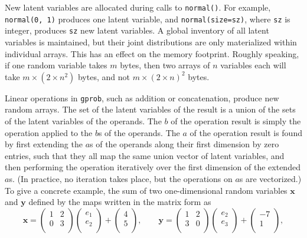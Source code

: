 \documentclass[a4paper,notitlepage]{article}
\renewcommand{\b}[1]{\mathbf{#1}}
\begin{document}
New latent variables are allocated during calls to \texttt{normal()}. For example, \texttt{normal(0, 1)} produces one latent variable, and \texttt{normal(size=sz)}, where \texttt{sz} is integer, produces \texttt{sz} new latent variables. A global inventory of all latent variables is maintained, but their joint distributions are only materialized within individual arrays. This has an effect on the memory footprint. Roughly speaking, if one random variable takes $m$ bytes, then two arrays of $n$ variables each will take $m\times(2\times n^2)$ bytes, and not $m\times (2\times n)^2$ bytes.


Linear operations in \texttt{gprob}, such as addition or concatenation, produce new random arrays.
The set of the latent variables of the result is a union of the sets of the latent variables of the operands. The $b$ of the operation result is simply the operation applied to the $b$s of the operands. The $a$ of the operation result is found by first extending the $a$s of the operands along their first dimension by zero entries, such that they all map the same union vector of latent variables, and then performing the operation iteratively over the first dimension of the extended $a$s. (In practice, no iteration takes place, but the operations on $a$s are vectorized.) To give a concrete example, the sum of two one-dimensional random variables $\b{x}$ and $\b{y}$ defined by the maps written in the matrix form as
\begin{equation}
\b{x}=
\begin{pmatrix}
1 & 2\\
0 & 3\\
\end{pmatrix}
\begin{pmatrix}
e_1\\ 
e_2\\
\end{pmatrix}
+
\begin{pmatrix}
4\\
5\\
\end{pmatrix},
\qquad
\b{y}=
\begin{pmatrix}
1 & 2\\
3 & 0\\
\end{pmatrix}
\begin{pmatrix}
e_2\\
e_3\\
\end{pmatrix}
+
\begin{pmatrix}
-7\\
1\\
\end{pmatrix},
\end{equation}
\end{document}
